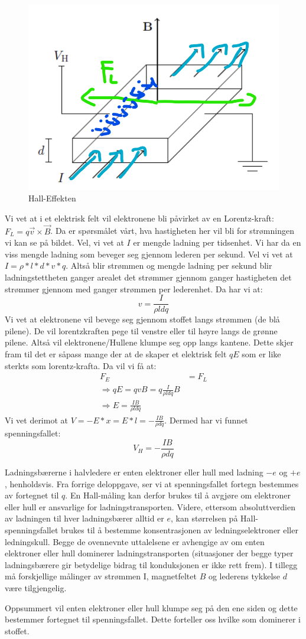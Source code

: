 \documentclass{article}
\begin{document}
\begin{figure}[H]
    \centering
    \includegraphics[width=0.5\linewidth]{bilder_lf/halleffekten.png}
    \caption{Hall-Effekten}
    \label{fig:halleffekten}
\end{figure}
Vi vet at i et elektrisk felt vil elektronene bli påvirket av en Lorentz-kraft: $F_L = q \vec{v} \times \vec{B}$. Da er spørsmålet vårt, hva hastigheten her vil bli for strømningen vi kan se på bildet. Vel, vi vet at $I$ er mengde ladning per tidsenhet. Vi har da en viss mengde ladning som beveger seg gjennom lederen per sekund. Vel vi vet at $I = \rho * l * d * v * q$. Altså blir strømmen og mengde ladning per sekund blir ladningstettheten ganger arealet det strømmer gjennom ganger hastigheten det strømmer gjennom med ganger strømmen per lederenhet. Da har vi at:
\begin{equation}
    v = \frac{I}{\rho l d q}
\end{equation}
Vi vet at elektronene vil bevege seg gjennom stoffet langs strømmen (de blå pilene). De vil lorentzkraften pege til venstre eller til høyre langs de grønne pilene. Altså vil elektronene/Hullene klumpe seg opp langs kantene. Dette skjer fram til det er såpass mange der at de skaper et elektrisk felt $qE$ som er like sterkts som lorentz-krafta. Da vil vi få at:
\begin{align}
    F_E &= F_L \\
    \Rightarrow qE = q v B = q  \frac{I}{\rho l d q} B \\
    \Rightarrow E = \frac{IB}{\rho l d q}
\end{align}
Vi vet derimot at $V = -E * x = E * l = -\frac{IB}{\rho d q}$. Dermed har vi funnet spenningsfallet:
\begin{equation}
    V_H = -\frac{IB}{\rho d q}
\end{equation}

Ladningsbærerne i halvledere er enten elektroner eller hull med ladning $-e$ og $+e$, henholdsvis. Fra forrige deloppgave, ser vi at spenningsfallet fortegn bestemmes av fortegnet til $q$. En Hall-måling kan derfor brukes til å avgjøre om elektroner eller hull er ansvarlige for ladningstransporten. Videre, ettersom absoluttverdien av ladningen til hver ladningsbærer alltid er $e$, kan størrelsen på Hall-spenningsfallet brukes til å bestemme konsentrasjonen av ledningselektroner eller ledningskull. Begge de ovennevnte uttalelsene er avhengige av om enten elektroner eller hull dominerer ladningstransporten (situasjoner der begge typer ladningsbærere gir betydelige bidrag til konduksjonen er ikke rett frem). I tillegg må forskjellige målinger av strømmen I, magnetfeltet $B$ og lederens tykkelse $d$ være tilgjengelig.

Oppsummert vil enten elektroner eller hull klumpe seg på den ene siden og dette bestemmer fortegnet til spenningsfallet. Dette forteller oss hvilke som dominerer i stoffet.

\newpage
\printbibliography
\end{document}
